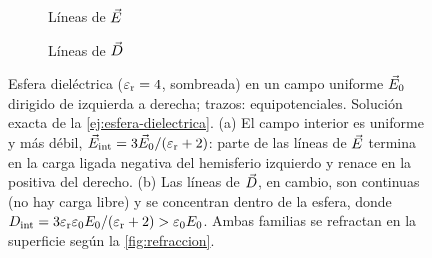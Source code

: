\begin{figure}[t]
\centering
{}
\begin{subfigure}[b]{0.49\textwidth}\centering
{}
\caption{Líneas de $\vec E$}
\end{subfigure}\hfill
\begin{subfigure}[b]{0.49\textwidth}\centering
{}
\caption{Líneas de $\vec D$}
\end{subfigure}
\caption{Esfera dieléctrica ($\varepsilon_{\mathrm r}=4$, sombreada) en un campo uniforme $\vec E_0$ dirigido de izquierda a
derecha; trazos: equipotenciales. Solución exacta de la \cref{ej:esfera-dielectrica}. (a) El campo
interior es uniforme y más débil, $\vec E_{\mathrm{int}}=3\vec E_0/(\varepsilon_{\mathrm r}+2)$: parte de las líneas de $\vec E$ termina en la carga
ligada negativa del hemisferio izquierdo y renace en la positiva del derecho. (b) Las líneas de $\vec D$, en
cambio, son continuas (no hay carga libre) y se concentran dentro de la esfera, donde
$D_{\mathrm{int}}=3\varepsilon_{\mathrm r}\varepsilon_0 E_0/(\varepsilon_{\mathrm r}+2)>\varepsilon_0 E_0$. Ambas familias se refractan en la superficie según la \cref{fig:refraccion}.}
\label{fig:esfera-dielectrica}
\end{figure}
